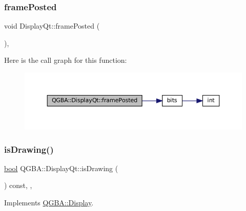 \subsubsection{\texorpdfstring{frame\+Posted}{framePosted}}
{\footnotesize\ttfamily void Display\+Qt\+::frame\+Posted (\begin{DoxyParamCaption}{ }\end{DoxyParamCaption})\hspace{0.3cm}{\ttfamily [override]}, {\ttfamily [slot]}}

Here is the call graph for this function\+:
\nopagebreak
\begin{figure}[H]
\begin{center}
\leavevmode
\includegraphics[width=350pt]{class_q_g_b_a_1_1_display_qt_a49d1bedef7318112a9c7a0ab33be314e_cgraph}
\end{center}
\end{figure}
\mbox{\label{class_q_g_b_a_1_1_display_qt_a7c01fcbb5a09686c2e0793039f810c05}} 
\subsubsection{\texorpdfstring{is\+Drawing()}{isDrawing()}}
{\footnotesize\ttfamily \mbox{\hyperlink{libretro_8h_a4a26dcae73fb7e1528214a068aca317e}{bool}} Q\+G\+B\+A\+::\+Display\+Qt\+::is\+Drawing (\begin{DoxyParamCaption}{ }\end{DoxyParamCaption}) const\hspace{0.3cm}{\ttfamily [inline]}, {\ttfamily [override]}, {\ttfamily [virtual]}}



Implements \mbox{\hyperlink{class_q_g_b_a_1_1_display_ace6799f5c31d1736c92033b2cf4daa31}{Q\+G\+B\+A\+::\+Display}}.

\mbox{\label{class_q_g_b_a_1_1_display_qt_a21bdc1c0c76369848e567083f930ee4a}} 
